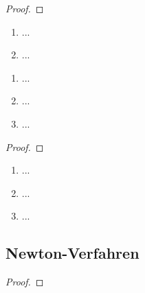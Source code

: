 \documentclass[12pt]{scrreprt}
\begin{document}
\begin{thm}\label{}

\end{thm}
\begin{proof}

\end{proof}

\begin{dfn}\label{}

\end{dfn}

\begin{bem}\label{}
\begin{enumerate}
\item ...
\item ...
\end{enumerate}
\end{bem}

\begin{thm}\label{}
\begin{enumerate}
\item ...
\item ...
\item ...
\end{enumerate}
\end{thm}
\begin{bsp*}

\end{bsp*}
\begin{proof}

\end{proof}

\begin{dfn}\label{}

\end{dfn}

\begin{bsp}\label{}
\begin{enumerate}
\item ...
\item ...
\item ...
\end{enumerate}
\end{bsp}

\subsection*{Newton-Verfahren}

\begin{thm}\label{}

\end{thm}
\begin{proof}

\end{proof}
\end{document}
